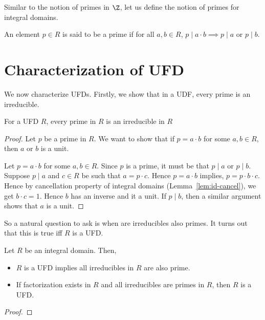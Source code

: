 Similar to the notion of primes in $\Z$, let us define the notion of primes
for integral domains.
\begin{definition}[Prime]
	An element $p \in R$ is said to be a prime if for all $a,b \in R$,
	$p \mid a\cdot b \implies p \mid a$ or $p \mid b$.
\end{definition}

\section{Characterization of UFD}
We now characterize UFDs. Firstly, we show that in a UDF, every prime is 
an irreducible.
\begin{lemma}
	For a UFD $R$, every prime in $R$ is an irreducible in $R$
\end{lemma}
\begin{proof}
	Let $p$ be a prime in $R$. We want to show that if $p=a\cdot b$ for
	some $a,b \in R$, then $a$ or $b$ is a unit.

	Let $p =a\cdot b$ for some $a, b \in R$. Since $p$ is a prime, it must
	be that $p \mid a$ or $p \mid b$. Suppose $p \mid a$ and $c \in R$ be
	such that $a = p\cdot  c$. Hence $p =a \cdot b$ implies, $p = p \cdot
	b \cdot c$. Hence by cancellation property of integral domains
	(Lemma~\ref{lem:id-cancel}), we get $b\cdot c = 1$. Hence $b$ has an
	inverse and it a unit. If $p \mid b$, then a similar argument shows
	that $a$ is a unit.
\end{proof}
So a natural question to ask is when are irreducibles also primes. It turns
out that this is true iff $R$ is a UFD. 
\begin{theorem}
	Let $R$ be an integral domain. Then,
	\begin{itemize}
		\item $R$ is a UFD implies all irreducibles in $R$ are also
			prime.
		\item If factorization exists in $R$ and all irreducibles are
			primes in $R$, then $R$ is a UFD.
	\end{itemize}
	\label{thm:ufd-characterisation}
\end{theorem}
\begin{proof}
	
\end{proof}


